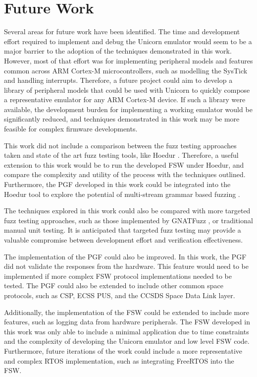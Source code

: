 \documentclass[../report.tex]{subfiles}
\begin{document}
\section{Future Work}

Several areas for future work have been identified. The time and development
effort required to implement and debug the Unicorn emulator would seem to be a
major barrier to the adoption of the techniques demonstrated in this work.
However, most of that effort was for implementing peripheral models and
features common across ARM Cortex-M microcontrollers, such as modelling the
SysTick and handling interrupts. Therefore, a future project could aim to
develop a library of peripheral models that could be used with Unicorn to
quickly compose a representative emulator for any ARM Cortex-M device. If such
a library were available, the development burden for implementing a working
emulator would be significantly reduced, and techniques demonstrated in this
work may be more feasible for complex firmware developments.

This work did not include a comparison between the fuzz testing approaches
taken and state of the art fuzz testing tools, like Hoedur \citep{Hoedur_2023}.
Therefore, a useful extension to this work would be to run the developed FSW
under Hoedur, and compare the complexity and utility of the process with the
techniques outlined. Furthermore, the PGF developed in this work could be
integrated into the Hoedur tool to explore the potential of multi-stream
grammar based fuzzing \citep{Hoedur_2023}.

The techniques explored in this work could also be compared with more targeted
fuzz testing approaches, such as those implemented by GNATFuzz \citep{gnatfuzz},
or traditional manual unit testing. It is anticipated that targeted fuzz
testing may provide a valuable compromise between development effort and
verification effectiveness.

The implementation of the PGF could also be improved. In this work, the PGF did
not validate the responses from the hardware. This feature would need to be
implemented if more complex FSW protocol implementations needed to be tested.
The PGF could also be extended to include other common space protocols, such as
CSP, ECSS PUS, and the CCSDS Space Data Link layer.

Additionally, the implementation of the FSW could be extended to include more
features, such as logging data from hardware peripherals. The FSW developed in
this work was only able to include a minimal application due to time
constraints and the complexity of developing the Unicorn emulator and low level
FSW code. Furthermore, future iterations of the work could include a more
representative and complex RTOS implementation, such as integrating FreeRTOS
into the FSW.
\end{document}
